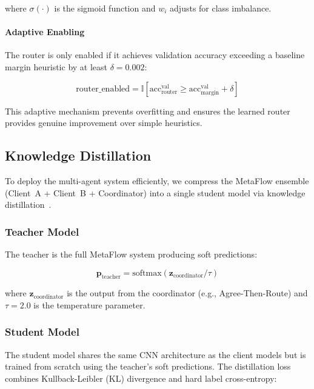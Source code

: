 \documentclass[12pt]{article}
\begin{document}
where $\sigma(\cdot)$ is the sigmoid function and $w_i$ adjusts for class imbalance.

\paragraph{Adaptive Enabling}

The router is only enabled if it achieves validation accuracy exceeding a baseline margin heuristic by at least $\delta = 0.002$:

\begin{equation}
\text{router\_enabled} = \mathbb{I}[\text{acc}_{\text{router}}^{\text{val}} \geq \text{acc}_{\text{margin}}^{\text{val}} + \delta]
\end{equation}

This adaptive mechanism prevents overfitting and ensures the learned router provides genuine improvement over simple heuristics.

\subsection{Knowledge Distillation}
\label{subsec:distillation}

To deploy the multi-agent system efficiently, we compress the MetaFlow ensemble (Client~A + Client~B + Coordinator) into a single student model via knowledge distillation~\cite{hinton2015distilling}.

\subsubsection{Teacher Model}

The teacher is the full MetaFlow system producing soft predictions:

\begin{equation}
\mathbf{p}_{\text{teacher}} = \text{softmax}(\mathbf{z}_{\text{coordinator}} / \tau)
\end{equation}

where $\mathbf{z}_{\text{coordinator}}$ is the output from the coordinator (e.g., Agree-Then-Route) and $\tau=2.0$ is the temperature parameter.

\subsubsection{Student Model}

The student model shares the same CNN architecture as the client models but is trained from scratch using the teacher's soft predictions. The distillation loss combines Kullback-Leibler (KL) divergence and hard label cross-entropy:
\end{document}
